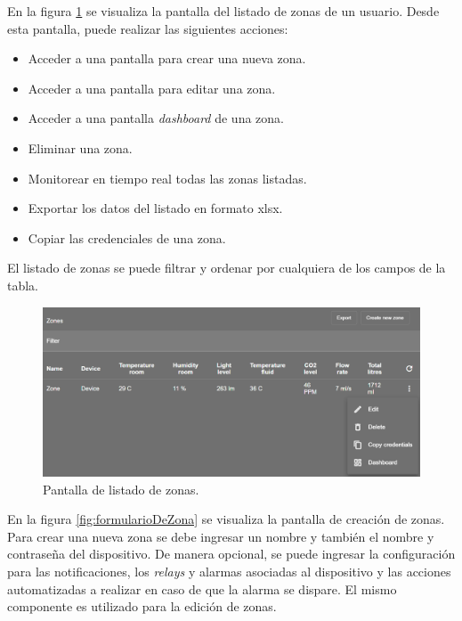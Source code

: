 En la figura \ref{fig:listaDeZonas} se visualiza la pantalla del listado de zonas de un usuario. Desde esta pantalla, puede realizar las siguientes acciones:

\begin{itemize}
	\item Acceder a una pantalla para crear una nueva zona.
	\item Acceder a una pantalla para editar una zona.
	\item Acceder a una pantalla \emph{dashboard} de una zona.
	\item Eliminar una zona.
	\item Monitorear en tiempo real todas las zonas listadas.
	\item Exportar los datos del listado en formato xlsx.
	\item Copiar las credenciales de una zona.
\end{itemize}

El listado de zonas se puede filtrar y ordenar por cualquiera de los campos de la tabla.

\begin{figure}[H]
	\centering
	\includegraphics[width=.9\textwidth]{./Figures/Frontend lista de zonas.png}
	\caption{Pantalla de listado de zonas.}
	\label{fig:listaDeZonas}
\end{figure}

En la figura \ref{fig:formularioDeZona} se visualiza la pantalla de creación de zonas. Para crear una nueva zona se debe ingresar un nombre y también el nombre y contraseña del dispositivo. De manera opcional, se puede ingresar la configuración para las notificaciones, los \textit{relays} y alarmas asociadas al dispositivo y las acciones automatizadas a realizar en caso de que la alarma se dispare. El mismo componente es utilizado para la edición de zonas. 

